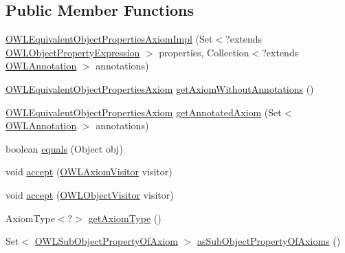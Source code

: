 \subsection*{Public Member Functions}
\begin{DoxyCompactItemize}
\item 
\hyperlink{classuk_1_1ac_1_1manchester_1_1cs_1_1owl_1_1owlapi_1_1_o_w_l_equivalent_object_properties_axiom_impl_ab3094a7b1ce14ede8836a001ce0a7cf6}{O\-W\-L\-Equivalent\-Object\-Properties\-Axiom\-Impl} (Set$<$?extends \hyperlink{interfaceorg_1_1semanticweb_1_1owlapi_1_1model_1_1_o_w_l_object_property_expression}{O\-W\-L\-Object\-Property\-Expression} $>$ properties, Collection$<$?extends \hyperlink{interfaceorg_1_1semanticweb_1_1owlapi_1_1model_1_1_o_w_l_annotation}{O\-W\-L\-Annotation} $>$ annotations)
\item 
\hyperlink{interfaceorg_1_1semanticweb_1_1owlapi_1_1model_1_1_o_w_l_equivalent_object_properties_axiom}{O\-W\-L\-Equivalent\-Object\-Properties\-Axiom} \hyperlink{classuk_1_1ac_1_1manchester_1_1cs_1_1owl_1_1owlapi_1_1_o_w_l_equivalent_object_properties_axiom_impl_ad729bdb71bd0852920271c0e13b2f658}{get\-Axiom\-Without\-Annotations} ()
\item 
\hyperlink{interfaceorg_1_1semanticweb_1_1owlapi_1_1model_1_1_o_w_l_equivalent_object_properties_axiom}{O\-W\-L\-Equivalent\-Object\-Properties\-Axiom} \hyperlink{classuk_1_1ac_1_1manchester_1_1cs_1_1owl_1_1owlapi_1_1_o_w_l_equivalent_object_properties_axiom_impl_a43f46468262ba4a974a1a9def330158a}{get\-Annotated\-Axiom} (Set$<$ \hyperlink{interfaceorg_1_1semanticweb_1_1owlapi_1_1model_1_1_o_w_l_annotation}{O\-W\-L\-Annotation} $>$ annotations)
\item 
boolean \hyperlink{classuk_1_1ac_1_1manchester_1_1cs_1_1owl_1_1owlapi_1_1_o_w_l_equivalent_object_properties_axiom_impl_ac2b13b5d563110869c4d41074be64bc2}{equals} (Object obj)
\item 
void \hyperlink{classuk_1_1ac_1_1manchester_1_1cs_1_1owl_1_1owlapi_1_1_o_w_l_equivalent_object_properties_axiom_impl_a1ad8ad196d5170e014cba2c16a94d24b}{accept} (\hyperlink{interfaceorg_1_1semanticweb_1_1owlapi_1_1model_1_1_o_w_l_axiom_visitor}{O\-W\-L\-Axiom\-Visitor} visitor)
\item 
void \hyperlink{classuk_1_1ac_1_1manchester_1_1cs_1_1owl_1_1owlapi_1_1_o_w_l_equivalent_object_properties_axiom_impl_a43665af187e2d5654a3a05b093106022}{accept} (\hyperlink{interfaceorg_1_1semanticweb_1_1owlapi_1_1model_1_1_o_w_l_object_visitor}{O\-W\-L\-Object\-Visitor} visitor)
\item 
Axiom\-Type$<$?$>$ \hyperlink{classuk_1_1ac_1_1manchester_1_1cs_1_1owl_1_1owlapi_1_1_o_w_l_equivalent_object_properties_axiom_impl_a075663a6726ffa12c7c008d32d069256}{get\-Axiom\-Type} ()
\item 
Set$<$ \hyperlink{interfaceorg_1_1semanticweb_1_1owlapi_1_1model_1_1_o_w_l_sub_object_property_of_axiom}{O\-W\-L\-Sub\-Object\-Property\-Of\-Axiom} $>$ \hyperlink{classuk_1_1ac_1_1manchester_1_1cs_1_1owl_1_1owlapi_1_1_o_w_l_equivalent_object_properties_axiom_impl_add24502bb34970185965bae0529e1e5c}{as\-Sub\-Object\-Property\-Of\-Axioms} ()
\end{DoxyCompactItemize}
